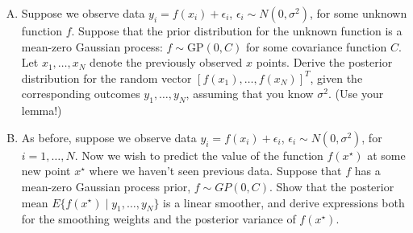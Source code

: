 \documentclass{mynotes}
\begin{document}
\begin{enumerate}[(A)]
\item Suppose we observe data $y_i = f(x_i) + \epsilon_i$, $\epsilon_i \sim N(0, \sigma^2)$, for some unknown function $f$. Suppose that the prior distribution for the unknown function is a mean-zero Gaussian process: $f \sim \mbox{GP}(0, C)$ for some covariance function $C$.  Let $x_1, \ldots, x_N$ denote the previously observed $x$ points.  Derive the posterior distribution for the random vector $[f(x_1), \ldots, f(x_N)]^T$, given the corresponding outcomes $y_1, \ldots, y_N$, assuming that you know $\sigma^2$.  (Use your lemma!)

\item As before, suppose we observe data $y_i = f(x_i) + \epsilon_i$, $\epsilon_i \sim N(0, \sigma^2)$, for $i=1, \ldots, N$.  Now we wish to predict the value of the function $f(x^{\star})$ at some new point $x^{\star}$ where we haven't seen previous data.  Suppose that $f$ has a mean-zero Gaussian process prior, $f \sim GP(0, C)$.  Show that the posterior mean $E\{ f(x^{\star}) \mid y_1, \ldots, y_N \}$ is a linear smoother, and derive expressions both for the smoothing weights and the posterior variance of $f(x^{\star})$.

\end{enumerate}
\end{document}
